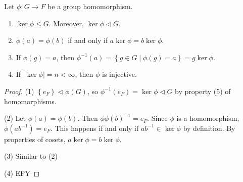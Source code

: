 \begin{theorem}\label{thm:kasj}
	Let $\phi : G \to F$ be a group homomorphism.
	\begin{enumerate}
		\item $\ker \phi \leq G$. Moreover, $\ker \phi \triangleleft G$.
		\item $\phi (a)=\phi (b)$ if and only if $a\ker \phi =b\ker \phi $.
		\item If $\phi (g)=a$, then $\phi ^{-1}(a)=\left\{ g\in G \mid \phi (g)=a \right\} =g\ker \phi $.
		\item If $\left| \ker \phi  \right| =n<\infty$, then $\phi $ is injective.
	\end{enumerate}
\end{theorem}
\begin{proof}
	(1) $\left\{ e_F \right\} \triangleleft \phi (G)$, so $\phi ^{-1}(e_F)=\ker \phi \triangleleft G$ by property (5) of homomorphisms.

	(2) Let $\phi (a)=\phi (b)$. Then $\phi \phi (b)^{-1}=e_F$. Since $\phi $ is a homomorphism, $\phi (ab^{-1})=e_F$. This happens if and only if $ab^{-1}\in \ker \phi $ by definition. By properties of cosets, $a\ker \phi =b\ker \phi $.

	(3) Similar to (2)

	(4) EFY
\end{proof}
